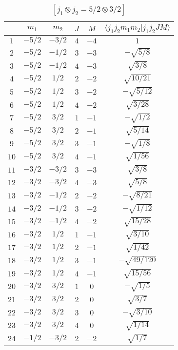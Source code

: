 \begin{table}
\tiny
\caption{$[j_1 \otimes j_2 = 5/2 \otimes 3/2]$}
\begin{center}
\begin{tabular}{|c|c|c|c|c|c|}
\hline 
   & $m_1$ & $m_2$ & $J$ & $M$ & $\langle j_1 j_2 m_1 m_2 | j_1 j_2 J M \rangle$ \\ 
\hline 
$1$ & $-5/2$ & $-3/2$ & $4$ & $-4$ & $1$ \\ 
$2$ & $-5/2$ & $-1/2$ & $3$ & $-3$ & $-\sqrt{5/8}$ \\ 
$3$ & $-5/2$ & $-1/2$ & $4$ & $-3$ & $\sqrt{3/8}$ \\ 
$4$ & $-5/2$ & $1/2$ & $2$ & $-2$ & $\sqrt{10/21}$ \\ 
$5$ & $-5/2$ & $1/2$ & $3$ & $-2$ & $-\sqrt{5/12}$ \\ 
$6$ & $-5/2$ & $1/2$ & $4$ & $-2$ & $\sqrt{3/28}$ \\ 
$7$ & $-5/2$ & $3/2$ & $1$ & $-1$ & $-\sqrt{1/2}$ \\ 
$8$ & $-5/2$ & $3/2$ & $2$ & $-1$ & $\sqrt{5/14}$ \\ 
$9$ & $-5/2$ & $3/2$ & $3$ & $-1$ & $-\sqrt{1/8}$ \\ 
$10$ & $-5/2$ & $3/2$ & $4$ & $-1$ & $\sqrt{1/56}$ \\ 
$11$ & $-3/2$ & $-3/2$ & $3$ & $-3$ & $\sqrt{3/8}$ \\ 
$12$ & $-3/2$ & $-3/2$ & $4$ & $-3$ & $\sqrt{5/8}$ \\ 
$13$ & $-3/2$ & $-1/2$ & $2$ & $-2$ & $-\sqrt{8/21}$ \\ 
$14$ & $-3/2$ & $-1/2$ & $3$ & $-2$ & $-\sqrt{1/12}$ \\ 
$15$ & $-3/2$ & $-1/2$ & $4$ & $-2$ & $\sqrt{15/28}$ \\ 
$16$ & $-3/2$ & $1/2$ & $1$ & $-1$ & $\sqrt{3/10}$ \\ 
$17$ & $-3/2$ & $1/2$ & $2$ & $-1$ & $\sqrt{1/42}$ \\ 
$18$ & $-3/2$ & $1/2$ & $3$ & $-1$ & $-\sqrt{49/120}$ \\ 
$19$ & $-3/2$ & $1/2$ & $4$ & $-1$ & $\sqrt{15/56}$ \\ 
$20$ & $-3/2$ & $3/2$ & $1$ & $0$ & $-\sqrt{1/5}$ \\ 
$21$ & $-3/2$ & $3/2$ & $2$ & $0$ & $\sqrt{3/7}$ \\ 
$22$ & $-3/2$ & $3/2$ & $3$ & $0$ & $-\sqrt{3/10}$ \\ 
$23$ & $-3/2$ & $3/2$ & $4$ & $0$ & $\sqrt{1/14}$ \\ 
$24$ & $-1/2$ & $-3/2$ & $2$ & $-2$ & $\sqrt{1/7}$ \\ 

\end{tabular}
\end{center}
\end{table}
